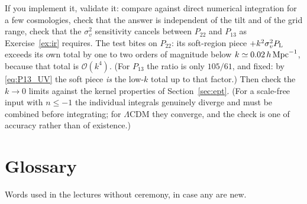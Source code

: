 \documentclass[a4paper,11pt]{article}
\def\Plin{P_{\rm L}}
\def\lcdm{$\Lambda$CDM}
\numberwithin{equation}{section}
\begin{document}
If you implement it, validate it: compare against direct numerical integration
for a few cosmologies, check that the answer is independent of the tilt and of
the grid range, check that the $\sigma_v^2$ sensitivity cancels between
$P_{22}$ and $P_{13}$ as Exercise~\ref{ex:ir} requires. The test bites on
$P_{22}$: its soft-region piece $+k^2\sigma_v^2\Plin$ exceeds its own total by
one to two orders of magnitude below $k \simeq 0.02\,h\,{\rm Mpc}^{-1}$, because
that total is $\mathcal{O}(k^4)$. (For $P_{13}$ the ratio is only $105/61$, and
fixed: by \eqref{eq:P13_UV} the soft piece \emph{is} the low-$k$ total up to
that factor.) Then check the
$k\to0$ limits against the kernel properties of Section~\ref{sec:ept}. (For a
scale-free input with $n \le -1$ the individual integrals genuinely diverge and
must be combined before integrating; for \lcdm{} they converge, and the check is
one of accuracy rather than of existence.)

\section{Glossary}
\label{app:glossary}

Words used in the lectures without ceremony, in case any are new.
\end{document}
